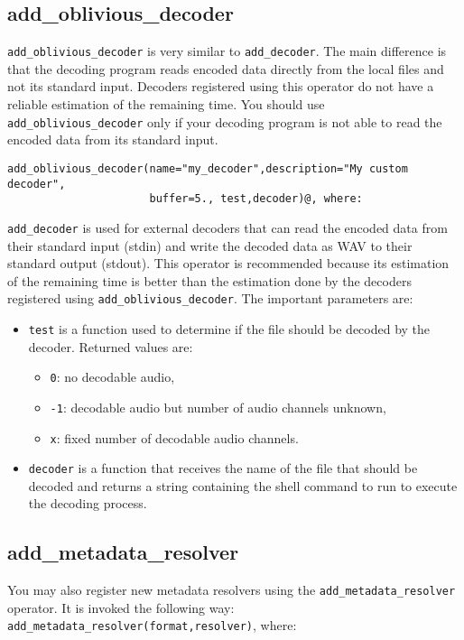 \subsection{add\_oblivious\_decoder}
\verb+add_oblivious_decoder+ is very similar to \verb+add_decoder+. The main difference is that the
decoding program reads encoded data directly from the local files and not its standard input.
Decoders registered using this operator do not have a reliable estimation of the remaining
time. You should use \verb+add_oblivious_decoder+ only if your decoding program is not able
to read the encoded data from its standard input.

\begin{verbatim}
add_oblivious_decoder(name="my_decoder",description="My custom decoder",
                      buffer=5., test,decoder)@, where:
\end{verbatim}
\verb+add_decoder+ is used for external decoders that can read the encoded data from their standard
input (stdin) and write the decoded data as WAV to their standard output (stdout). This operator
is recommended because its estimation of the remaining time is better than the estimation done
by the decoders registered using \verb+add_oblivious_decoder+. The important parameters are:

\begin{itemize}
\item \verb+test+ is a function used to determine if the file should be decoded by the decoder. Returned values are: \begin{itemize}
\item \verb+0+: no decodable audio,
\item \verb+-1+: decodable audio but number of audio channels unknown,
\item \verb+x+: fixed number of decodable audio channels.

\end{itemize}

\item \verb+decoder+ is a function that receives the name of the file that should be decoded and returns a string containing the shell command to run to execute the decoding process.

\end{itemize}
\subsection{add\_metadata\_resolver}
You may also register new metadata resolvers using the \verb+add_metadata_resolver+ operator. It is invoked the
following way: \verb+add_metadata_resolver(format,resolver)+, where:

